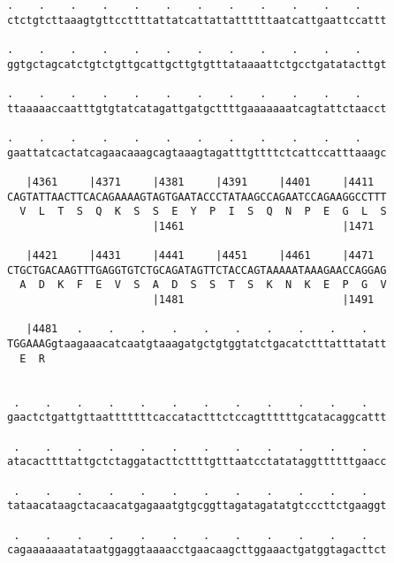 \documentclass{article}
\begin{document}
\begin{Verbatim}
.    .    .    .    .    .    .    .    .    .    .    .    
ctctgtcttaaagtgttccttttattatcattattattttttaatcattgaattccattt
                                                            
.    .    .    .    .    .    .    .    .    .    .    .    
ggtgctagcatctgtctgttgcattgcttgtgtttataaaattctgcctgatatacttgt
                                                            
.    .    .    .    .    .    .    .    .    .    .    .    
ttaaaaaccaatttgtgtatcatagattgatgcttttgaaaaaaatcagtattctaacct
                                                            
.    .    .    .    .    .    .    .    .    .    .    .    
gaattatcactatcagaacaaagcagtaaagtagatttgttttctcattccatttaaagc
                                                            
   |4361     |4371     |4381     |4391     |4401     |4411  
CAGTATTAACTTCACAGAAAAGTAGTGAATACCCTATAAGCCAGAATCCAGAAGGCCTTT
  V  L  T  S  Q  K  S  S  E  Y  P  I  S  Q  N  P  E  G  L  S
                       |1461                         |1471  
  
   |4421     |4431     |4441     |4451     |4461     |4471  
CTGCTGACAAGTTTGAGGTGTCTGCAGATAGTTCTACCAGTAAAAATAAAGAACCAGGAG
  A  D  K  F  E  V  S  A  D  S  S  T  S  K  N  K  E  P  G  V
                       |1481                         |1491  
  
   |4481   .    .    .    .    .    .    .    .    .    .   
TGGAAAGgtaagaaacatcaatgtaaagatgctgtggtatctgacatctttatttatatt
  E  R                                                      
                                                            
  
 .    .    .    .    .    .    .    .    .    .    .    .   
gaactctgattgttaatttttttcaccatactttctccagttttttgcatacaggcattt
                                                            
 .    .    .    .    .    .    .    .    .    .    .    .   
atacacttttattgctctaggatacttcttttgtttaatcctatataggttttttgaacc
                                                            
 .    .    .    .    .    .    .    .    .    .    .    .   
tataacataagctacaacatgagaaatgtgcggttagatagatatgtcccttctgaaggt
                                                            
 .    .    .    .    .    .    .    .    .    .    .    .   
cagaaaaaaatataatggaggtaaaacctgaacaagcttggaaactgatggtagacttct
                                                            

\end{Verbatim}
\end{document}
